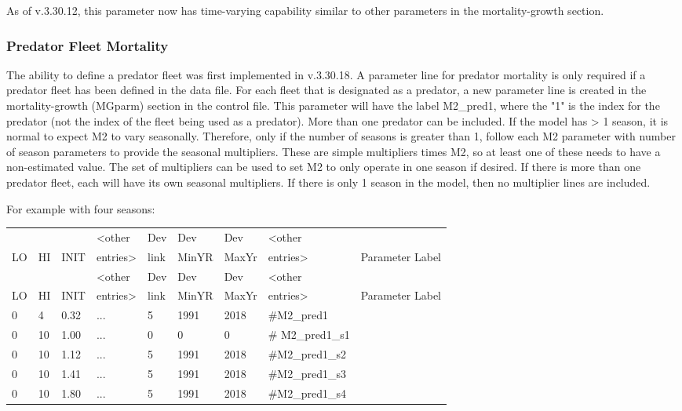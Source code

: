 As of v.3.30.12, this parameter now has time-varying capability similar to other parameters in the mortality-growth section.

\subsubsection{Predator Fleet Mortality}
The ability to define a predator fleet was first implemented in v.3.30.18.  A parameter line for predator mortality is only required if a predator fleet has been defined in the data file. For each fleet that is designated as a predator, a new parameter line is created in the mortality-growth (MGparm) section in the control file. This parameter will have the label M2\_pred1, where the "1" is the index for the predator (not the index of the fleet being used as a predator). More than one predator can be included. If the model has > 1 season, it is normal to expect M2 to vary seasonally. Therefore, only if the number of seasons is greater than 1, follow each M2 parameter with number of season parameters to provide the seasonal multipliers. These are simple multipliers times M2, so at least one of these needs to have a non-estimated value. The set of multipliers can be used to set M2 to only operate in one season if desired. If there is more than one predator fleet, each will have its own seasonal multipliers. If there is only 1 season in the model, then no multiplier lines are included. 

For example with four seasons:
\begin{longtable}{p{0.75cm} p{0.75cm} p{1cm}  p{1.5cm}  p{1.1cm}  p{1.1cm} p{1.1cm}  p{1.1cm}  p{4cm}  }
	\hline
	   &    &      &  <other  & Dev  & Dev   & Dev   & <other  & \Tstrut\\
	LO & HI & INIT &  entries>& link & MinYR & MaxYr & entries>&Parameter Label \Bstrut\\
	\hline
	\endfirsthead
	
	\hline
	   &    &      &  <other  & Dev  & Dev   & Dev   & <other  & \Tstrut\\
    LO & HI & INIT &  entries>& link & MinYR & MaxYr & entries>&Parameter Label \Bstrut\\
	\hline
	\endhead
	
	\hline
	\endfoot
	
	\endlastfoot
	
	0 &  4 & 0.32 & ... & 5 & 1991 & 2018 & \#M2\_pred1\Tstrut\\
	0 & 10 & 1.00 & ... & 0 & 0    & 0    & \# M2\_pred1\_s1\\
	0 & 10 & 1.12 & ... & 5 & 1991 & 2018 & \#M2\_pred1\_s2 \\
	0 & 10 & 1.41 & ... & 5 & 1991 & 2018 & \#M2\_pred1\_s3 \\
	0 & 10 & 1.80 & ... & 5 & 1991 & 2018 & \#M2\_pred1\_s4 \Bstrut\\		
	\hline
\end{longtable}

